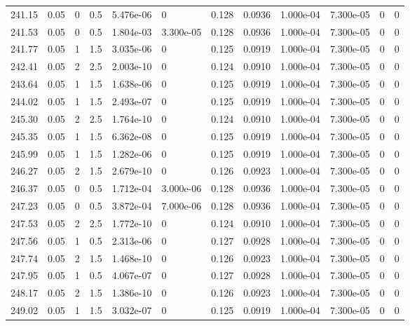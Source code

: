 \documentclass[preview]{standalone}
\begin{document}
{{{{{{{{\begin{tabular}{L{1.2cm}C{1.2cm} C{0.3cm}C{0.5cm} C{1.4cm}C{1.4cm} C{1.4cm}C{1.4cm} C{1.6cm}C{1.6cm} C{1.6cm}C{1.6cm}}
  241.15  &  0.05  & 0     & 0.5 &  5.476e-06  & 0  &  0.128&   0.0936& 1.000e-04 & 7.300e-05   &  0 & 0  \\ 
  241.53  &  0.05  & 0     & 0.5 &  1.804e-03  & 3.300e-05  &  0.128&   0.0936& 1.000e-04 & 7.300e-05   &  0 & 0  \\ 
  241.77  &  0.05  & 1     & 1.5 &  3.035e-06  & 0  &  0.125&   0.0919& 1.000e-04 & 7.300e-05   &  0 & 0  \\ 
  242.41  &  0.05  & 2     & 2.5 &  2.003e-10  & 0  &  0.124&   0.0910& 1.000e-04 & 7.300e-05   &  0 & 0  \\ 
  243.64  &  0.05  & 1     & 1.5 &  1.638e-06  & 0  &  0.125&   0.0919& 1.000e-04 & 7.300e-05   &  0 & 0  \\ 
  244.02  &  0.05  & 1     & 1.5 &  2.493e-07  & 0  &  0.125&   0.0919& 1.000e-04 & 7.300e-05   &  0 & 0  \\ 
  245.30  &  0.05  & 2     & 2.5 &  1.764e-10  & 0  &  0.124&   0.0910& 1.000e-04 & 7.300e-05   &  0 & 0  \\ 
  245.35  &  0.05  & 1     & 1.5 &  6.362e-08  & 0  &  0.125&   0.0919& 1.000e-04 & 7.300e-05   &  0 & 0  \\ 
  245.99  &  0.05  & 1     & 1.5 &  1.282e-06  & 0  &  0.125&   0.0919& 1.000e-04 & 7.300e-05   &  0 & 0  \\ 
  246.27  &  0.05  & 2     & 1.5 &  2.679e-10  & 0  &  0.126&   0.0923& 1.000e-04 & 7.300e-05   &  0 & 0  \\ 
  246.37  &  0.05  & 0     & 0.5 &  1.712e-04  & 3.000e-06  &  0.128&   0.0936& 1.000e-04 & 7.300e-05   &  0 & 0  \\ 
  247.23  &  0.05  & 0     & 0.5 &  3.872e-04  & 7.000e-06  &  0.128&   0.0936& 1.000e-04 & 7.300e-05   &  0 & 0  \\ 
  247.53  &  0.05  & 2     & 2.5 &  1.772e-10  & 0  &  0.124&   0.0910& 1.000e-04 & 7.300e-05   &  0 & 0  \\ 
  247.56  &  0.05  & 1     & 0.5 &  2.313e-06  & 0  &  0.127&   0.0928& 1.000e-04 & 7.300e-05   &  0 & 0  \\ 
  247.74  &  0.05  & 2     & 1.5 &  1.468e-10  & 0  &  0.126&   0.0923& 1.000e-04 & 7.300e-05   &  0 & 0  \\ 
  247.95  &  0.05  & 1     & 0.5 &  4.067e-07  & 0  &  0.127&   0.0928& 1.000e-04 & 7.300e-05   &  0 & 0  \\ 
  248.17  &  0.05  & 2     & 1.5 &  1.386e-10  & 0  &  0.126&   0.0923& 1.000e-04 & 7.300e-05   &  0 & 0  \\ 
  249.02  &  0.05  & 1     & 1.5 &  3.032e-07  & 0  &  0.125&   0.0919& 1.000e-04 & 7.300e-05   &  0 & 0  \\ 

\end{tabular}}}}}}}}}
\end{document}
